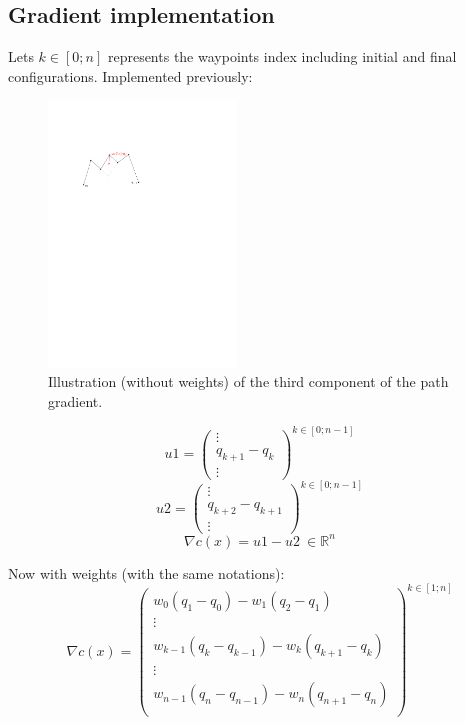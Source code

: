 \documentclass {article}
\newcommand\real{\mathbb{R}}
\begin{document}
\vspace{0.4cm}

\subsection{Gradient implementation}

Lets $k\in [0;n]$ represents the waypoints index including initial and final 
configurations. Implemented previously:

\begin{figure}
	\includegraphics[width=5cm]{gradient.pdf}
	\caption{Illustration (without weights) of the third component of the path gradient.}
	\label{fig:gradient}
\end{figure}

$$
u1 = 
\left(\begin{array}{c} 
\vdots\\
q_{k+1} - q_k\\
\vdots
\end{array}
\right)^{k \in [0;n-1]}
$$
$$
u2 = 
\left(\begin{array}{c} 
\vdots\\
q_{k+2} - q_{k+1}\\
\vdots
\end{array}
\right)^{k \in [0;n-1]}
$$
$$
\nabla c(x) = u1 - u2 \ \in \real^n
$$

Now with weights (with the same notations):\\

$$
\nabla c(x) =
\left(\begin{array}{c}
w_0(q_{1} - q_{0}) -w_{1}(q_{2} - q_{1})\\
\vdots\\
w_{k-1}(q_{k} - q_{k-1}) -w_{k}(q_{k+1} - q_{k})\\
\vdots\\
w_{n-1}(q_{n} - q_{n-1}) -w_{n}(q_{n+1} - q_{n})\\
\end{array}
\right)^{k \in [1;n]}
$$
\end{document}
